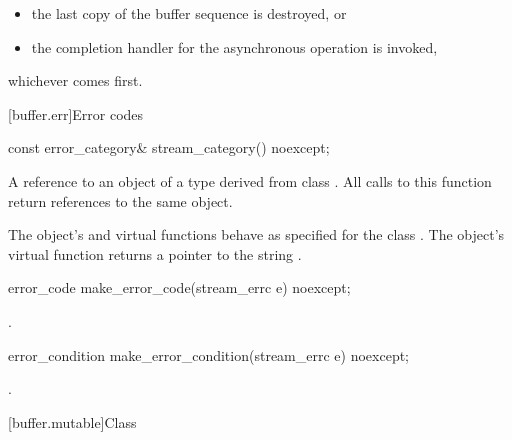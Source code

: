 \begin{itemize}
\item the last copy of the buffer sequence is destroyed, or
\item the completion handler for the asynchronous operation is invoked,
\end{itemize}

whichever comes first.




%
[buffer.err]{Error codes}

%
\begin{itemdecl}
const error_category& stream_category() noexcept;
\end{itemdecl}

\begin{itemdescr}
\pnum
\returns A reference to an object of a type derived from class . All calls to this function return references to the same object.

\pnum
The object's  and  virtual functions behave as specified for the class . The object's  virtual function returns a pointer to the string .
\end{itemdescr}

%
\begin{itemdecl}
error_code make_error_code(stream_errc e) noexcept;
\end{itemdecl}

\begin{itemdescr}
\pnum
\returns {}.
\end{itemdescr}

%
\begin{itemdecl}
error_condition make_error_condition(stream_errc e) noexcept;
\end{itemdecl}

\begin{itemdescr}
\pnum
\returns {}.
\end{itemdescr}



[buffer.mutable]{Class }

